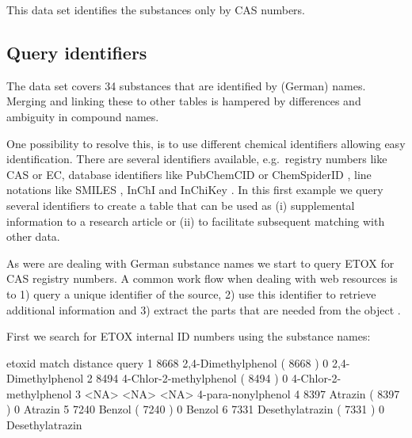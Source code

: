\documentclass[article, shortnames]{jss}\usepackage[]{graphicx}\usepackage[]{color}
\begin{document}
This data set identifies the substances only by CAS numbers.


\subsection[Query identifiers]{Query identifiers}
The  data set covers 34 substances that are identified by (German) names.
Merging and linking these to other tables is hampered by differences and ambiguity in compound names.

One possibility to resolve this, is to use different chemical identifiers allowing easy identification.
There are several identifiers available, e.g.\  registry numbers like CAS or EC, database identifiers like PubChemCID \citep{Kim_2016} or ChemSpiderID \citep{pence_chemspider:_2010}, line notations like SMILES \citep{Weininger_1990}, InChI and InChiKey \citep{Heller_McNaught_Pletnev_Stein_Tchekhovskoi_2015}. 
In this first example we query several identifiers to create a table that can be used as (i) supplemental information to a research article or (ii) to facilitate subsequent matching with other data.

As were are dealing with German substance names we start to query ETOX for CAS registry numbers.
A common work flow when dealing with web resources is to 1) query a unique identifier of the source, 2) use this identifier to retrieve additional information and 3) extract the parts that are needed from the  object \citep{Chamberlain_Szocs_2013}.

First we search for ETOX internal ID numbers using the substance names:

\begin{CodeChunk}
\begin{CodeOutput}
  etoxid                           match distance                  query
1   8668     2,4-Dimethylphenol ( 8668 )        0     2,4-Dimethylphenol
2   8494 4-Chlor-2-methylphenol ( 8494 )        0 4-Chlor-2-methylphenol
3   <NA>                            <NA>     <NA>     4-para-nonylphenol
4   8397                Atrazin ( 8397 )        0                Atrazin
5   7240                 Benzol ( 7240 )        0                 Benzol
6   7331        Desethylatrazin ( 7331 )        0        Desethylatrazin
\end{CodeOutput}
\end{CodeChunk}
\end{document}
